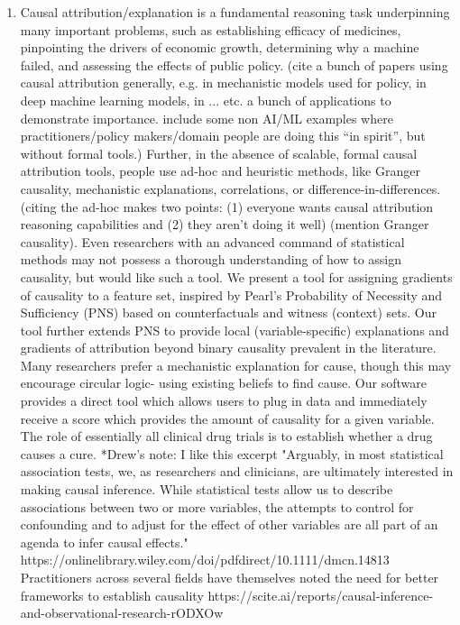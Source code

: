 \documentclass{article}
\begin{document}
\begin{enumerate}
    \item Causal attribution/explanation is a fundamental reasoning task underpinning many important problems, such as establishing efficacy of medicines, pinpointing the drivers of economic growth, determining why a machine failed, and assessing the effects of public policy. (cite a bunch of papers using causal attribution generally, e.g. in mechanistic models used for policy, in deep machine learning models, in ... etc. a bunch of applications to demonstrate importance. include some non AI/ML examples where practitioners/policy makers/domain people are doing this ``in spirit'', but without formal tools.) Further, in the absence of scalable, formal causal attribution tools, people use ad-hoc and heuristic methods, like Granger causality, mechanistic explanations, correlations, or difference-in-differences. (citing the ad-hoc makes two points: (1) everyone wants causal attribution reasoning capabilities and (2) they aren't doing it well) (mention Granger causality). Even researchers with an advanced command of statistical methods may not possess a thorough understanding of how to assign causality, but would like such a tool.
We present a tool for assigning gradients of causality to a feature set, inspired by Pearl's Probability of Necessity and Sufficiency (PNS) based on counterfactuals and witness (context) sets. Our tool further extends PNS to provide local (variable-specific) explanations and gradients of attribution beyond binary causality prevalent in the literature.
Many researchers prefer a mechanistic explanation for cause, though this may encourage circular logic- using existing beliefs to find cause. Our software provides a direct tool which allows users to plug in data and immediately receive a score which provides the amount of causality for a given variable. 
The role of essentially all clinical drug trials is to establish whether a drug causes a cure.
*Drew's note: I like this excerpt "Arguably, in most statistical association tests, we, as researchers and clinicians, are ultimately interested in making causal inference. While statistical tests allow us to describe associations between two or more variables, the attempts to control for confounding and to adjust for the effect of other variables are all part of an agenda to infer causal effects."
https://onlinelibrary.wiley.com/doi/pdfdirect/10.1111/dmcn.14813
Practitioners across several fields have themselves noted the need for better frameworks to establish causality https://scite.ai/reports/causal-inference-and-observational-research-rODXOw

\end{enumerate}
\end{document}
